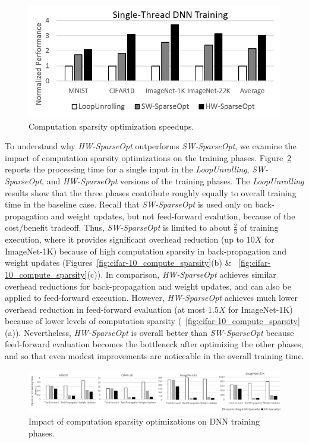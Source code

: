 \begin{figure}
 \centering
 \includegraphics[width=.95\columnwidth]{Figures/computation_sparsity_speedup.png}
\caption{Computation sparsity optimization speedups.}
 \label{fig:computation_sparsity_speedup}
 \end{figure}

To understand why {\it HW-SparseOpt} outperforms {\it SW-SparseOpt}, we examine the impact of computation sparsity optimizations on the training phases.  Figure~\ref{fig:training_breakdown} reports the processing time for a single input in the {\it LoopUnrolling}, {\it SW-SparseOpt}, and {\it HW-SparseOpt} versions of the training phases.  The {\it LoopUnrolling} results show that the three phases contribute roughly equally to overall training time in the baseline case.  Recall that {\it SW-SparseOpt} is used only on back-propagation and weight updates, but not feed-forward evalution, because of the cost/benefit tradeoff.   Thus, {\it SW-SparseOpt} is limited to about \(\frac{2}{3}\) of training execution, where it provides significant overhead reduction (up to $10X$ for ImageNet-1K) because of high computation sparsity in back-propagation and weight updates (Figures~\ref{fig:cifar-10_compute_sparsity}(b) \& ~\ref{fig:cifar-10_compute_sparsity}(c)).   In comparison, {\it HW-SparseOpt} achieves similar overhead reductions for back-propagation and weight updates, and can also be applied to feed-forward execution.  However,  {\it HW-SparseOpt}  achieves much lower overhead reduction in feed-forward evaluation  (at most $1.5X$ for ImageNet-1K) because of lower levels of computation sparsity (~\ref{fig:cifar-10_compute_sparsity}(a)).  Nevertheless, {\it HW-SparseOpt} is overall better than {\it SW-SparseOpt} because feed-forward evaluation becomes the bottleneck after optimizing the other phases, and so that even modest improvements are noticeable in the overall training time.

 \begin{figure}
 \centering
 \includegraphics[height=0.75in, width=1.95\columnwidth]{Figures/training_time_breakdown.png}
\caption{Impact of computation sparsity optimizations on DNN training phases.}
 \label{fig:training_breakdown}
 \end{figure}


